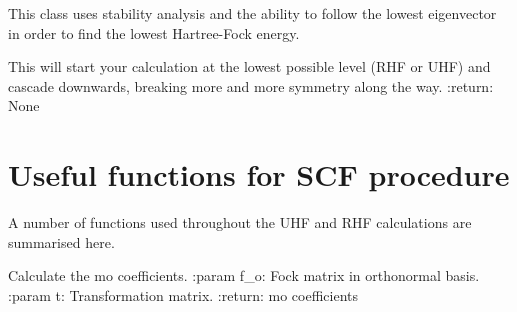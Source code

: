 \documentclass[letterpaper,10pt,english]{sphinxmanual}
\begin{document}
\begin{fulllineitems}
\label{\detokenize{lowest_HF:hf.HartreeFock.lowest_HF.Find}}
This class uses stability analysis and the ability to follow the lowest eigenvector in order to find the lowest
Hartree-Fock energy.

\begin{fulllineitems}
\label{\detokenize{lowest_HF:hf.HartreeFock.lowest_HF.Find.run_algorithm}}
This will start your calculation at the lowest possible level (RHF or UHF) and cascade downwards,
breaking more and more symmetry along the way.
:return: None

\end{fulllineitems}


\end{fulllineitems}

\label{\detokenize{SCF_functions:module-hf.utilities.SCF_functions}}

\chapter{Useful functions for SCF procedure}
\label{\detokenize{SCF_functions:useful-functions-for-scf-procedure}}\label{\detokenize{SCF_functions::doc}}
A number of functions used throughout the UHF and RHF calculations are summarised here.

\begin{fulllineitems}
\label{\detokenize{SCF_functions:hf.utilities.SCF_functions.calc_mo}}
Calculate the mo coefficients.
:param f\_o: Fock matrix in orthonormal basis.
:param t: Transformation matrix.
:return: mo coefficients

\end{fulllineitems}
\end{document}
